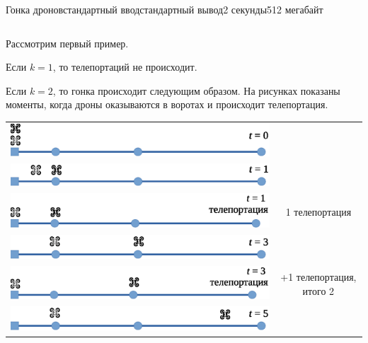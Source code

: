 \begin{problem}{Гонка дронов}{стандартный ввод}{стандартный вывод}{2 секунды}{512 мегабайт}
\begin{center}
\begin{tabular}{|c|c|c|c|c|c|c|}
\end{tabular}
\endgroup
\end{center}

\Examples

\begin{example}
%
%
%
\end{example}

\newpage
\Explanations
Рассмотрим первый пример. 

Если $k = 1$, то телепортаций не происходит.

Если $k=2$, то гонка происходит следующим образом. На рисунках показаны моменты, когда дроны оказываются в воротах и происходит телепортация.

\medskip
\begin{center}
\begin{tabular}{cc}
\renewcommand{\arraystretch}{2}
\includegraphics[scale=0.7]{sample-2-01.eps}\\[0.8cm]
\includegraphics[scale=0.7]{sample-2-02.eps}\\[0.3cm]
\includegraphics[scale=0.7]{sample-2-03.eps}&{1 телепортация}\\[0.8cm]
\includegraphics[scale=0.7]{sample-2-04.eps}\\[0.3cm]
\includegraphics[scale=0.7]{sample-2-05.eps}&{+1 телепортация, итого 2}\\[0.8cm]
\includegraphics[scale=0.7]{sample-2-06.eps}\\[0.3cm]

\end{tabular}
\end{center}
\end{problem}
